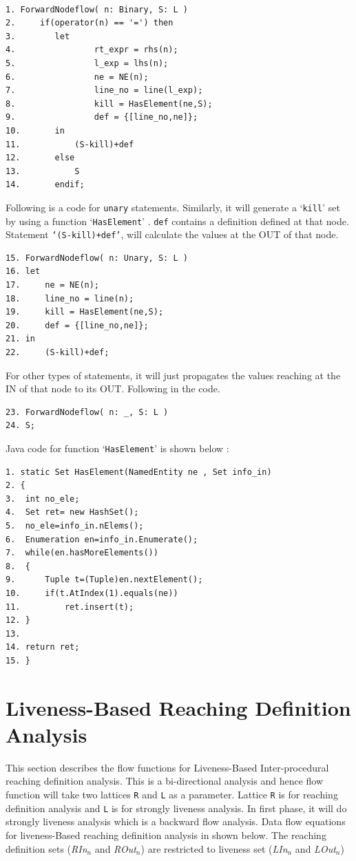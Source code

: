 \documentclass[11pt,a4paper,openright]{report}
\begin{document}
\begin{lstlisting}[]  % Start your code-block

1. ForwardNodeflow( n: Binary, S: L )
2.     if(operator(n) == '=') then   
3.        let        
4.                rt_expr = rhs(n);
5.                l_exp = lhs(n);
6.                ne = NE(n);
7.                line_no = line(l_exp);
8.                kill = HasElement(ne,S); 
9.                def = {[line_no,ne]};
10.       in
11.       	  (S-kill)+def        
12.       else
13.        	  S
14.       endif;
\end{lstlisting}

Following is a code for \texttt{unary} statements. Similarly, it will generate a `\texttt{kill}' set by using a function `\texttt{HasElement}' 
. \texttt{def} contains a definition defined at that node. Statement \texttt{`(S-kill)+def'}, will calculate the values at the OUT of that
node.
\begin{lstlisting}[]
15. ForwardNodeflow( n: Unary, S: L )
16.	let
17.		ne = NE(n);
18.		line_no = line(n);
19.		kill = HasElement(ne,S);
20.		def = {[line_no,ne]};
21.	in
22.		(S-kill)+def;
\end{lstlisting}

For other types of statements, it will just propagates the values reaching at the IN of that node to its OUT. Following in the code.

\begin{lstlisting}[]
23. ForwardNodeflow( n: _, S: L ) 
24.	S;
\end{lstlisting}

Java code for function `\texttt{HasElement}' is shown below :
\begin{lstlisting}
1. static Set HasElement(NamedEntity ne , Set info_in)
2. {
3.	int no_ele;
4.	Set ret= new HashSet();
5.	no_ele=info_in.nElems();
6.	Enumeration en=info_in.Enumerate();
7.	while(en.hasMoreElements())
8.	{
9.		Tuple t=(Tuple)en.nextElement();
10.		if(t.AtIndex(1).equals(ne))
11.			ret.insert(t);
12.	}	
13.
14.	return ret;
15. }

\end{lstlisting}

\section{Liveness-Based Reaching Definition Analysis}
This section describes the flow functions for Liveness-Based Inter-procedural reaching definition analysis. This is a bi-directional
analysis and hence flow function will take two lattices \texttt{R} and \texttt{L} as a parameter. Lattice \texttt{R} is for reaching definition analysis and
\texttt{L} is for strongly liveness analysis. In first phase, it will do strongly liveness analysis which is a backward flow analysis.
Data flow equations for liveness-Based reaching definition analysis in shown below. The reaching definition sets (\textit{RIn}$_n$ and \textit{ROut}$_n$) are restricted 
to liveness set (\textit{LIn}$_n$ and \textit{LOut}$_n$)
\end{document}

